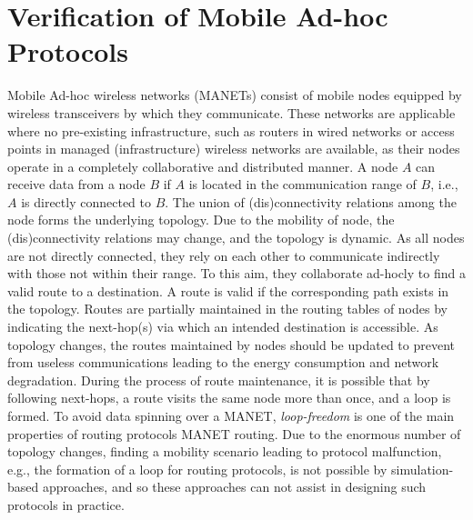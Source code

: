 \section{Verification of Mobile Ad-hoc Protocols}\label{sec::wrebeca} 
Mobile Ad-hoc wireless networks (MANETs) consist of mobile nodes equipped by wireless transceivers by which they communicate. These networks are applicable where no pre-existing infrastructure, such as routers in wired networks or access points in managed (infrastructure) wireless networks are available, as their nodes operate in a completely collaborative and distributed manner. A node $A$ can receive data from a node $B$ if $A$ is located in the communication range of $B$, i.e., $A$ is directly connected to $B$. The union of (dis)connectivity relations among the node forms the underlying topology.  Due to the mobility of node, the (dis)connectivity relations may change, and the topology is dynamic. As all nodes are not directly connected, they rely on each other to communicate indirectly with those not within their range. To this aim, they collaborate ad-hocly to find a valid route to a destination. A route is valid if the corresponding path exists in the topology. Routes are partially maintained in the routing tables of nodes by indicating the next-hop(s) via which an intended destination is accessible. As topology changes, the routes maintained by nodes should be updated to prevent from useless communications leading to the energy consumption and network degradation. During the process of route maintenance, it is possible that by following next-hops, a route visits the same node more than once, and a loop is formed. To avoid data spinning over a MANET, \emph{loop-freedom} is one of the main properties of routing protocols MANET routing. Due to the enormous number of topology changes, finding a mobility scenario leading to protocol malfunction, e.g., the formation of a loop for routing protocols, is not possible by simulation-based approaches, and so these approaches can not assist in designing such protocols in practice. %


